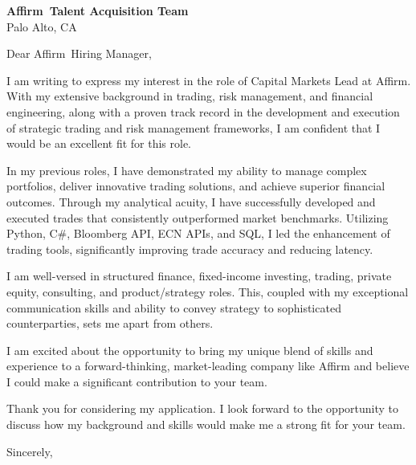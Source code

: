 \documentclass{letter}
\newcommand{\company}{Affirm}
\begin{document}
\begin{letter}{\textbf{\company\ Talent Acquisition Team} \\                
    Palo Alto, CA }

\opening{Dear \company\ Hiring Manager,}

I am writing to express my interest in the role of Capital Markets Lead at Affirm. With my extensive background in trading, risk management, and financial engineering, along with a proven track record in the development and execution of strategic trading and risk management frameworks, I am confident that I would be an excellent fit for this role.

In my previous roles, I have demonstrated my ability to manage complex portfolios, deliver innovative trading solutions, and achieve superior financial outcomes. Through my analytical acuity, I have successfully developed and executed trades that consistently outperformed market benchmarks. Utilizing Python, C#, Bloomberg API, ECN APIs, and SQL, I led the enhancement of trading tools, significantly improving trade accuracy and reducing latency.

I am well-versed in structured finance, fixed-income investing, trading, private equity, consulting, and product/strategy roles. This, coupled with my exceptional communication skills and ability to convey strategy to sophisticated counterparties, sets me apart from others.

I am excited about the opportunity to bring my unique blend of skills and experience to a forward-thinking, market-leading company like Affirm and believe I could make a significant contribution to your team.

Thank you for considering my application. I look forward to the opportunity to discuss how my background and skills would make me a strong fit for your team.



\closing{Sincerely,}

\end{letter}
\end{document}
